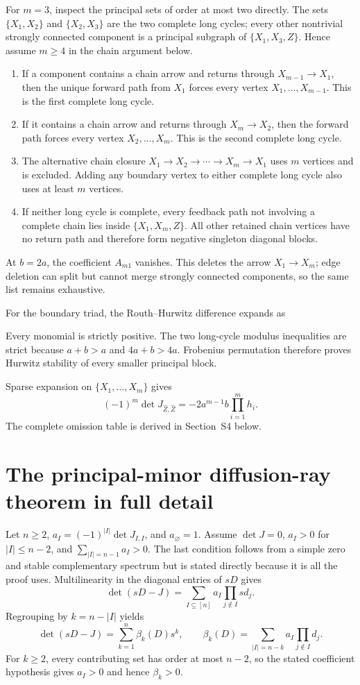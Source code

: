 \documentclass[10pt]{article}
\newcommand{\1}{\mathbf1}
\begin{document}
For $m=3$, inspect the principal sets of order at most two directly.  The sets
$\{X_1,X_2\}$ and $\{X_2,X_3\}$ are the two complete long cycles; every
other nontrivial strongly connected component is a principal subgraph of
$\{X_1,X_3,Z\}$.  Hence assume $m\ge4$ in the chain argument below.

\begin{enumerate}[leftmargin=2em]
\item If a component contains a chain arrow and returns through
$X_{m-1}\to X_1$, then the unique forward path from $X_1$ forces every vertex
$X_1,\ldots,X_{m-1}$.  This is the first complete long cycle.
\item If it contains a chain arrow and returns through $X_m\to X_2$, then the
forward path forces every vertex $X_2,\ldots,X_m$.  This is the second complete
long cycle.
\item The alternative chain closure
$X_1\to X_2\to\cdots\to X_m\to X_1$ uses $m$ vertices and is excluded.
Adding any boundary vertex to either complete long cycle also uses at least
$m$ vertices.
\item If neither long cycle is complete, every feedback path not involving a
complete chain lies inside $\{X_1,X_m,Z\}$.  All other retained chain vertices
have no return path and therefore form negative singleton diagonal blocks.
\end{enumerate}
At $b=2a$, the coefficient $A_{m1}$ vanishes.  This deletes the arrow
$X_1\to X_m$; edge deletion can split but cannot merge strongly connected
components, so the same list remains exhaustive.

For the boundary triad, the Routh--Hurwitz difference expands as

Every monomial is strictly positive.  The two long-cycle modulus inequalities
are strict because $a+b>a$ and $4a+b>4a$.  Frobenius permutation therefore
proves Hurwitz stability of every smaller principal block.

Sparse expansion on $\{X_1,\ldots,X_m\}$ gives
\[
 (-1)^m\det J_{\widehat Z,\widehat Z}
 =-2a^{m-1}b\prod_{i=1}^m h_i.
\]
The complete omission table is derived in Section~S4 below.

\section{The principal-minor diffusion-ray theorem in full detail}


Let $n\ge2$, $a_I=(-1)^{|I|}\det J_{I,I}$, and $a_\varnothing=1$.  Assume
$\det J=0$, $a_I>0$ for $|I|\le n-2$, and
$\sum_{|I|=n-1}a_I>0$.  The last condition follows from a simple zero and
stable complementary spectrum but is stated directly because it is all the
proof uses.  Multilinearity in the diagonal entries of $sD$ gives
\[
 \det(sD-J)=\sum_{I\subseteq[n]}a_I
 \prod_{j\notin I}sd_j.
\]
Regrouping by $k=n-|I|$ yields
\[
 \det(sD-J)=\sum_{k=1}^n\beta_k(D)s^k,
 \qquad
 \beta_k(D)=\sum_{|I|=n-k}a_I\prod_{j\notin I}d_j.
\]
For $k\ge2$, every contributing set has order at most $n-2$, so the stated coefficient hypothesis gives $a_I>0$ and hence $\beta_k>0$.
\end{document}
